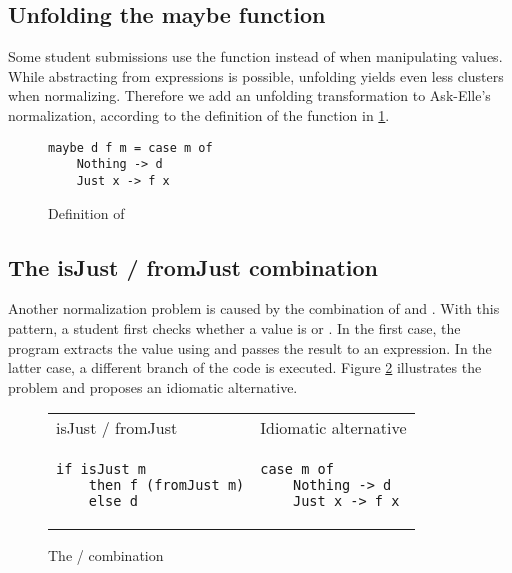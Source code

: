 \subsection{Unfolding the maybe function}

Some student submissions use the  function instead of  when manipulating  values. While abstracting  from  expressions is possible, unfolding  yields even less clusters when normalizing. Therefore we add an unfolding transformation to Ask-Elle's normalization, according to the definition of the function in \ref{fig:maybe-definition}.


\begin{figure}
\centering
\begin{verbatim}
maybe d f m = case m of
    Nothing -> d
    Just x -> f x
\end{verbatim}
\caption{Definition of }
\label{fig:maybe-definition}
\end{figure}

\subsection{The isJust / fromJust combination}

Another normalization problem is caused by the combination of  and . With this pattern, a student first checks whether a value is  or . In the first case, the program extracts the value using  and passes the result to an expression. In the latter case, a different branch of the code is executed. Figure \ref{fig:maybe-isjust-fromjust} illustrates the problem and proposes an idiomatic alternative.

\begin{figure}
\centering
\begin{tabular}{ >{\centering\arraybackslash}m{13em} >{\centering\arraybackslash}m{13em} }
isJust / fromJust & Idiomatic alternative \\
\begin{verbatim}
if isJust m
    then f (fromJust m)
    else d
\end{verbatim}
& \begin{verbatim}
case m of
    Nothing -> d
    Just x -> f x
\end{verbatim}
\end{tabular}
\caption{The  /  combination}
\label{fig:maybe-isjust-fromjust}
\end{figure}

